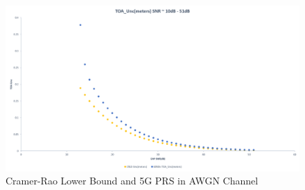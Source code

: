\documentclass{article}
\begin{document}
\newpage
\begin{figure}[h]
\caption{Cramer-Rao Lower Bound and 5G PRS in AWGN Channel}
\centering
\includegraphics[scale=0.5]{CRLB_toa}
\end{figure}
\end{document}
